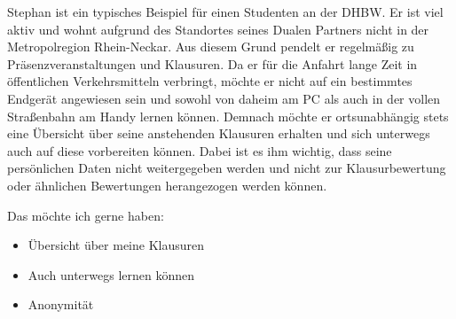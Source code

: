 Stephan ist ein typisches Beispiel für einen Studenten an der DHBW.
Er ist viel aktiv und wohnt aufgrund des Standortes seines Dualen Partners nicht in der Metropolregion Rhein-Neckar. Aus diesem Grund pendelt er regelmäßig zu Präsenzveranstaltungen und Klausuren. Da er für die Anfahrt lange Zeit in öffentlichen Verkehrsmitteln verbringt, möchte er nicht auf ein bestimmtes Endgerät angewiesen sein und sowohl von daheim am PC als auch in der vollen Straßenbahn am Handy lernen können.  Demnach möchte er ortsunabhängig stets eine Übersicht über seine anstehenden Klausuren erhalten und sich unterwegs auch auf diese vorbereiten können. Dabei ist es ihm wichtig, dass seine persönlichen Daten nicht weitergegeben werden und nicht zur Klausurbewertung oder ähnlichen Bewertungen herangezogen werden können.

Das möchte ich gerne haben:
\begin{itemize}
	\item Übersicht über meine Klausuren
	\item Auch unterwegs lernen können
	\item Anonymität
\end{itemize}

